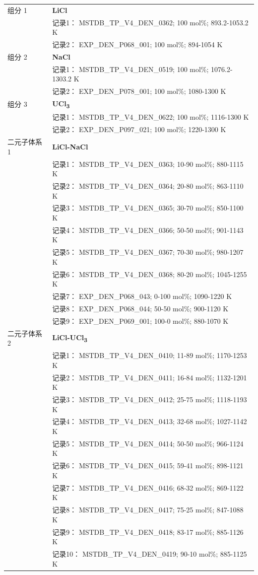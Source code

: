\documentclass[12pt]{article}
\begin{document}
{\begin{longtable}[]{@{}
  >{\raggedright\arraybackslash}p{}
  >{\raggedright\arraybackslash}p{}@{}}
组分 1  & \textbf{LiCl} \\
 & 记录1： MSTDB\_TP\_V4\_DEN\_0362; 100 mol\%; 893.2-1053.2 K \\
 & 记录2： EXP\_DEN\_P068\_001; 100 mol\%; 894-1054 K  \\

组分 2  & \textbf{NaCl} \\
 & 记录1： MSTDB\_TP\_V4\_DEN\_0519; 100 mol\%; 1076.2-1303.2 K \\
 & 记录2： EXP\_DEN\_P078\_001; 100 mol\%; 1080-1300 K  \\

组分 3  & \textbf{UCl\textsubscript{3}} \\
 & 记录1： MSTDB\_TP\_V4\_DEN\_0622; 100 mol\%; 1116-1300 K \\
 & 记录2： EXP\_DEN\_P097\_021; 100 mol\%; 1220-1300 K  \\

二元子体系 1  & \textbf{LiCl-NaCl} \\
 & 记录1： MSTDB\_TP\_V4\_DEN\_0363; 10-90 mol\%; 880-1115 K \\
 & 记录2： MSTDB\_TP\_V4\_DEN\_0364; 20-80 mol\%; 863-1110 K \\
 & 记录3： MSTDB\_TP\_V4\_DEN\_0365; 30-70 mol\%; 850-1100 K \\
 & 记录4： MSTDB\_TP\_V4\_DEN\_0366; 50-50 mol\%; 901-1143 K \\
 & 记录5： MSTDB\_TP\_V4\_DEN\_0367; 70-30 mol\%; 980-1207 K \\
 & 记录6： MSTDB\_TP\_V4\_DEN\_0368; 80-20 mol\%; 1045-1255 K \\
 & 记录7： EXP\_DEN\_P068\_043; 0-100 mol\%; 1090-1220 K \\
 & 记录8： EXP\_DEN\_P068\_044; 50-50 mol\%; 900-1120 K \\
 & 记录9： EXP\_DEN\_P069\_001; 100-0 mol\%; 880-1070 K  \\

二元子体系 2  & \textbf{LiCl-UCl\textsubscript{3}} \\
 & 记录1： MSTDB\_TP\_V4\_DEN\_0410; 11-89 mol\%; 1170-1253 K \\
 & 记录2： MSTDB\_TP\_V4\_DEN\_0411; 16-84 mol\%; 1132-1201 K \\
 & 记录3： MSTDB\_TP\_V4\_DEN\_0412; 25-75 mol\%; 1118-1193 K \\
 & 记录4： MSTDB\_TP\_V4\_DEN\_0413; 32-68 mol\%; 1027-1142 K \\
 & 记录5： MSTDB\_TP\_V4\_DEN\_0414; 50-50 mol\%; 966-1124 K \\
 & 记录6： MSTDB\_TP\_V4\_DEN\_0415; 59-41 mol\%; 898-1121 K \\
 & 记录7： MSTDB\_TP\_V4\_DEN\_0416; 68-32 mol\%; 869-1122 K \\
 & 记录8： MSTDB\_TP\_V4\_DEN\_0417; 75-25 mol\%; 847-1088 K \\
 & 记录9： MSTDB\_TP\_V4\_DEN\_0418; 83-17 mol\%; 885-1126 K \\
 & 记录10： MSTDB\_TP\_V4\_DEN\_0419; 90-10 mol\%; 885-1125 K  \\


\end{longtable}}
\end{document}
